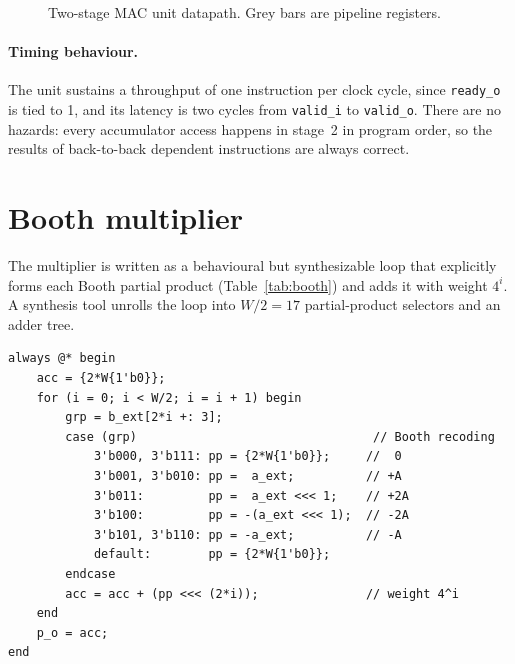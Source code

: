 \documentclass[11pt,a4paper]{report}
\newcommand{\code}[1]{\texttt{#1}}
\begin{document}
\begin{figure}[H]
  \caption{Two-stage MAC unit datapath. Grey bars are pipeline registers.}
  \label{fig:arch}
\end{figure}

\paragraph{Timing behaviour.}
The unit sustains a throughput of one instruction per clock cycle, since
\code{ready\_o} is tied to 1, and its latency is two cycles from
\code{valid\_i} to \code{valid\_o}. There are no hazards: every accumulator
access happens in stage~2 in program order, so the results of back-to-back
dependent instructions are always correct.

\section{Booth multiplier}
The multiplier is written as a behavioural but synthesizable loop that
explicitly forms each Booth partial product (Table~\ref{tab:booth}) and adds
it with weight $4^i$. A synthesis tool unrolls the loop into $W/2=17$
partial-product selectors and an adder tree.

\begin{lstlisting}[firstnumber=69, caption={Booth recoding loop in \code{booth\_multiplier.v}.}]
always @* begin
    acc = {2*W{1'b0}};
    for (i = 0; i < W/2; i = i + 1) begin
        grp = b_ext[2*i +: 3];
        case (grp)                                 // Booth recoding
            3'b000, 3'b111: pp = {2*W{1'b0}};     //  0
            3'b001, 3'b010: pp =  a_ext;          // +A
            3'b011:         pp =  a_ext <<< 1;    // +2A
            3'b100:         pp = -(a_ext <<< 1);  // -2A
            3'b101, 3'b110: pp = -a_ext;          // -A
            default:        pp = {2*W{1'b0}};
        endcase
        acc = acc + (pp <<< (2*i));               // weight 4^i
    end
    p_o = acc;
end
\end{lstlisting}
\end{document}
